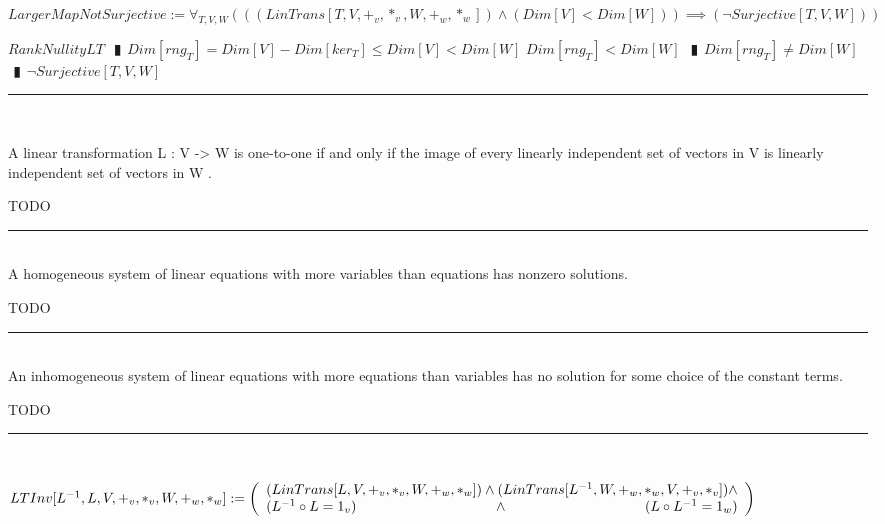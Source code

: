 \documentclass{book}
\newcommand{\abr}{:=}
\newcommand{\pipe}{$\phantom{(}\vrectangleblack\phantom{)}$}
\newcommand{\pr}[1]{\left(#1\right)}
\begin{document}
$LargerMapNotSurjective \abr \forall_{T, V, W}\pr{\pr{(LinTrans[T, V, +_v, *_v, W, +_w, *_w]) \land (Dim[V] < Dim[W])} \implies (\lnot Surjective[T, V, W])}$
\begin{enumerate}
  \lit $RankNullityLT$ \pipe $Dim[rng_T] = Dim[V] - Dim[ker_T] \leq Dim[V] < Dim[W]$
  \lit $Dim[rng_T] < Dim[W]$ \pipe $Dim[rng_T] \neq Dim[W]$ \pipe $\lnot Surjective[T, V, W]$
\end{enumerate} \vspace{.75mm} \hrule \vspace{.75mm} \ \\ 

\begin{shaded} %
A linear transformation L : V -> W is one-to-one if and only if the image of every linearly independent set of vectors in V is linearly independent set of vectors in W .
\begin{enumerate}
  \lit TODO
\end{enumerate} \vspace{.75mm} \hrule \vspace{.75mm} \ \\ 

A homogeneous system of linear equations with more variables than equations has nonzero solutions.
\begin{enumerate}
  \lit TODO
\end{enumerate} \vspace{.75mm} \hrule \vspace{.75mm} \ \\ 

An inhomogeneous system of linear equations with more equations than variables has no solution for some choice of the constant terms.
\begin{enumerate}
  \lit TODO
\end{enumerate} \vspace{.75mm} \hrule \vspace{.75mm} \ \\ 
\end{shaded} %

$LTInv[L^{-1}, L, V, +_v, *_v, W, +_w, *_w] \abr \left(\begin{array}{ll}
  (LinTrans[L, V, +_v, *_v, W, +_w, *_w]) \hfill \land \hfill (LinTrans[L^{-1}, W, +_w, *_w, V, +_v, *_v]) \hfill \land \hfill \\
  (L^{-1} \circ L = 1_v) \hfill \land \hfill (L \circ L^{-1} = 1_w)
\end{array}\right)$ \\
\end{document}
